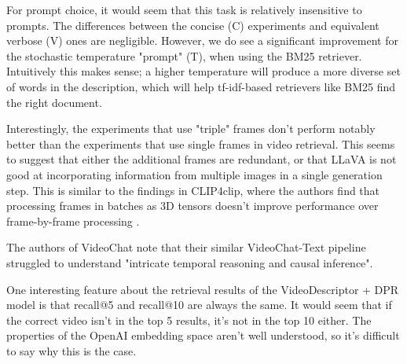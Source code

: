 For prompt choice, it would seem that this task is relatively insensitive to prompts.
The differences between the concise (C) experiments and equivalent verbose (V) ones are negligible.
However, we do see a significant improvement for the stochastic temperature "prompt" (T), when using the BM25 retriever.
Intuitively this makes sense; a higher temperature will produce a more diverse set of words in the description, which will help tf-idf-based retrievers like BM25 find the right document.

Interestingly, the experiments that use "triple" frames don't perform notably better than the experiments that use single frames in video retrieval.
This seems to suggest that either the additional frames are redundant, or that LLaVA is not good at incorporating information from multiple images in a single generation step.
This is similar to the findings in CLIP4clip, where the authors find that processing frames in batches as 3D tensors doesn't improve performance over frame-by-frame processing \cite{clip4clip}.

The authors of VideoChat note that their similar VideoChat-Text pipeline struggled to understand "intricate temporal reasoning and causal inference".

One interesting feature about the retrieval results of the VideoDescriptor + DPR model is that recall@5 and recall@10 are always the same.
It would seem that if the correct video isn't in the top 5 results, it's not in the top 10 either.
The properties of the OpenAI embedding space aren't well understood, so it's difficult to say why this is the case.

